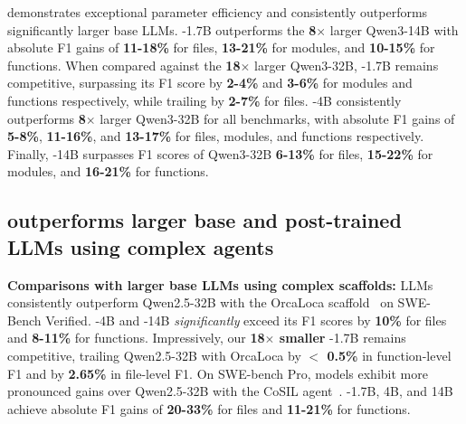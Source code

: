 \methodname demonstrates exceptional parameter efficiency and consistently outperforms significantly larger base LLMs. \methodname-1.7B outperforms the \textbf{8$\times$} larger Qwen3-14B with absolute F1 gains of \textbf{11-18\%} for files, \textbf{13-21\%} for modules, and \textbf{10-15\%} for functions. When compared against the \textbf{18$\times$} larger Qwen3-32B, \methodname-1.7B remains competitive, surpassing its F1 score by \textbf{2-4\%} and \textbf{3-6\%} for modules and functions respectively, while trailing by \textbf{2-7\%} for files. \methodname-4B consistently outperforms \textbf{8$\times$} larger Qwen3-32B for all benchmarks, with absolute F1 gains of \textbf{5-8\%}, \textbf{11-16\%}, and \textbf{13-17\%} for files, modules, and functions respectively. Finally, \methodname-14B surpasses F1 scores of Qwen3-32B \textbf{6-13\%} for files, \textbf{15-22\%} for modules, and \textbf{16-21\%} for functions.

\subsection{\methodname outperforms larger base and post-trained LLMs using complex agents}\label{complex_baseline_results}

\textbf{Comparisons with larger base LLMs using complex scaffolds:} \methodname LLMs consistently outperform Qwen2.5-32B with the OrcaLoca scaffold~\citep{yu2025orcalocallmagentframework} on SWE-Bench Verified. \methodname-4B and \methodname-14B \emph{significantly} exceed its F1 scores by \textbf{10\%} for files and \textbf{8-11\%} for functions. Impressively, our \textbf{18$\times$ smaller} \methodname-1.7B remains  competitive, trailing Qwen2.5-32B with OrcaLoca by \textbf{$<$ 0.5\%} in function-level F1 and by \textbf{2.65\%} in file-level F1. On SWE-bench Pro, \methodname models exhibit more pronounced gains over Qwen2.5-32B with the CoSIL agent~\citep{jiang2025issuelocalizationllmdriveniterative}. \methodname-1.7B, 4B, and 14B achieve absolute F1 gains of \textbf{20-33\%} for files and \textbf{11-21\%} for functions. 



